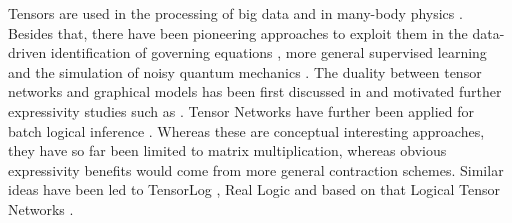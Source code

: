 Tensors are used in the processing of big data \cite{cichocki_era_2014} and in many-body physics \cite{orus_tensor_2019}.
Besides that, there have been pioneering approaches to exploit them in the data-driven identification of governing equations \cite{gels_multidimensional_2019, goesmann_tensor_2020}, more general supervised learning \cite{stoudenmire_supervised_2016} and the simulation of noisy quantum mechanics \cite{sander_large-scale_2025}.
The duality between tensor networks and graphical models has been first discussed in \cite{robeva_duality_2019} and motivated further expressivity studies such as \cite{glasser_expressive_2019}.
Tensor Networks have further been applied for batch logical inference \cite{li_linear_2017, sato_linear_2017, tsilionis_tensor-based_2024}.
Whereas these are conceptual interesting approaches, they have so far been limited to matrix multiplication, whereas obvious expressivity benefits would come from more general contraction schemes.
Similar ideas have been led to TensorLog \cite{cohen_tensorlog_2020}, Real Logic \cite{serafini_learning_2016} and based on that Logical Tensor Networks \cite{badreddine_logic_2022}.
